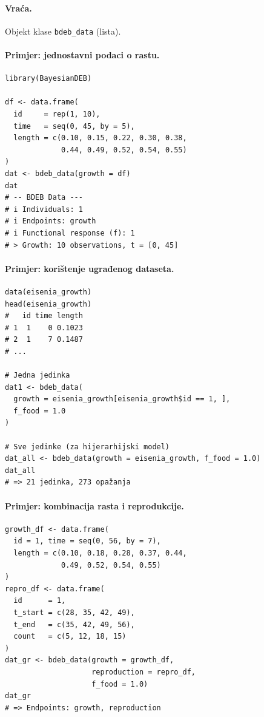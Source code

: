\documentclass[11pt,a4paper]{article}
\newcommand{\code}[1]{\texttt{#1}}
\begin{document}
\paragraph{Vraća.} Objekt klase \code{bdeb\_data} (lista).

\paragraph{Primjer: jednostavni podaci o rastu.}
\begin{lstlisting}
library(BayesianDEB)

df <- data.frame(
  id     = rep(1, 10),
  time   = seq(0, 45, by = 5),
  length = c(0.10, 0.15, 0.22, 0.30, 0.38,
             0.44, 0.49, 0.52, 0.54, 0.55)
)
dat <- bdeb_data(growth = df)
dat
# -- BDEB Data ---
# i Individuals: 1
# i Endpoints: growth
# i Functional response (f): 1
# > Growth: 10 observations, t = [0, 45]
\end{lstlisting}

\paragraph{Primjer: korištenje ugrađenog dataseta.}
\begin{lstlisting}
data(eisenia_growth)
head(eisenia_growth)
#   id time length
# 1  1    0 0.1023
# 2  1    7 0.1487
# ...

# Jedna jedinka
dat1 <- bdeb_data(
  growth = eisenia_growth[eisenia_growth$id == 1, ],
  f_food = 1.0
)

# Sve jedinke (za hijerarhijski model)
dat_all <- bdeb_data(growth = eisenia_growth, f_food = 1.0)
dat_all
# => 21 jedinka, 273 opažanja
\end{lstlisting}

\paragraph{Primjer: kombinacija rasta i reprodukcije.}
\begin{lstlisting}
growth_df <- data.frame(
  id = 1, time = seq(0, 56, by = 7),
  length = c(0.10, 0.18, 0.28, 0.37, 0.44,
             0.49, 0.52, 0.54, 0.55)
)
repro_df <- data.frame(
  id      = 1,
  t_start = c(28, 35, 42, 49),
  t_end   = c(35, 42, 49, 56),
  count   = c(5, 12, 18, 15)
)
dat_gr <- bdeb_data(growth = growth_df,
                    reproduction = repro_df,
                    f_food = 1.0)
dat_gr
# => Endpoints: growth, reproduction
\end{lstlisting}
\end{document}
